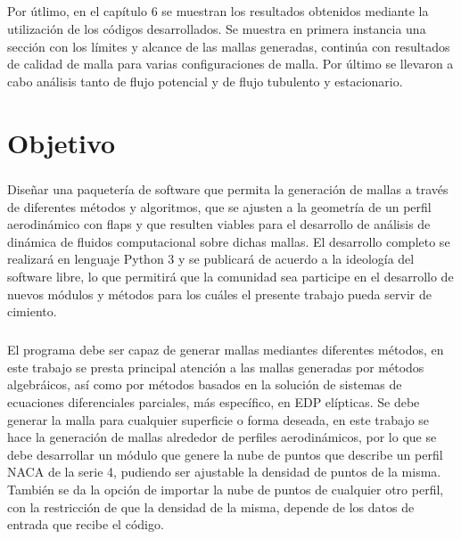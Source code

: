 \documentclass[letterpaper, openright, 12pt]{book}
\begin{document}
    \paragraph*{}
    Por útlimo, en el capítulo 6 se muestran los resultados obtenidos mediante
    la utilización de los códigos desarrollados. Se muestra en primera
    instancia una sección con los límites y alcance de las mallas generadas,
    continúa con resultados de calidad de malla para varias configuraciones de
    malla. Por último se llevaron a cabo análisis tanto de flujo potencial y de
    flujo tubulento y estacionario.


    \chapter*{Objetivo}

    \paragraph*{}
    Diseñar una paquetería de software que permita la generación de mallas a
    través de diferentes métodos y algoritmos, que se ajusten a la geometría de
    un perfil aerodinámico con flaps y que resulten viables para el desarrollo
    de análisis  de dinámica de fluidos computacional sobre dichas mallas.
    El desarrollo completo se realizará en lenguaje Python 3 y se publicará de
    acuerdo a la ideología del software libre, lo que permitirá que la comunidad
    sea participe en el desarrollo de nuevos módulos y métodos para los cuáles
    el presente trabajo pueda servir de cimiento.

    \paragraph*{}
    El programa debe ser capaz de generar  mallas mediantes diferentes
    métodos, en este trabajo se presta principal atención a las mallas
    generadas por métodos algebráicos, así como por métodos basados en la
    solución de sistemas de ecuaciones diferenciales parciales,
    más específico, en EDP elípticas. Se debe generar la malla para
    cualquier superficie o forma deseada, en este trabajo se hace la
    generación de mallas alrededor de perfiles aerodinámicos, por lo que se
    debe desarrollar un módulo que genere la nube de puntos que describe un
    perfil NACA de la serie 4, pudiendo ser ajustable la densidad de puntos
    de la misma. También se da la opción de importar la nube de puntos de
    cualquier otro perfil, con la restricción de que la densidad de la
    misma, depende de los datos de entrada que recibe el código.
\end{document}
